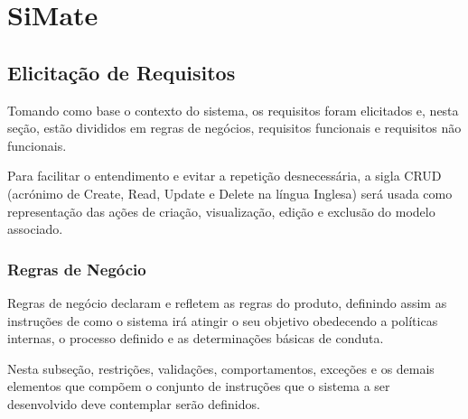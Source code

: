
\chapter{SiMate}

\section{Elicitação de Requisitos}

Tomando como base o contexto do sistema, os requisitos foram elicitados e, nesta seção, estão divididos em regras de negócios, requisitos funcionais e requisitos não funcionais.

Para facilitar o entendimento e evitar a repetição desnecessária, a sigla CRUD (acrónimo de Create, Read, Update e Delete na língua Inglesa) será usada como representação das ações de criação, visualização, edição e exclusão do modelo associado.

\subsection{Regras de Negócio} \label{subsec:regras_de_negocio}

Regras de negócio declaram e refletem as regras do produto, definindo assim as instruções de como o sistema irá atingir o seu objetivo obedecendo a políticas internas, o processo definido e as determinações básicas de conduta. 

Nesta subseção, restrições, validações, comportamentos, exceções e os demais elementos que compõem o conjunto de instruções que o sistema a ser desenvolvido deve contemplar serão definidos.

